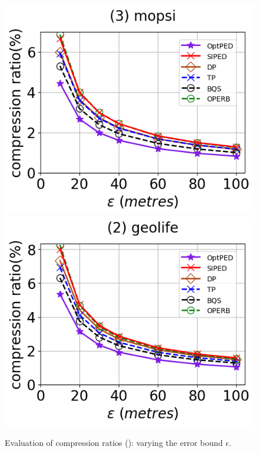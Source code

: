 \begin{figure}[tb!]
	\includegraphics[scale=0.315]{Figures/Exp-PED-CR-epsilon-mopsi.png}		\hspace{1ex}
	\includegraphics[scale=0.315]{Figures/Exp-PED-CR-epsilon-geolife.png}
	\vspace{-2.5ex}
	\caption{\small Evaluation of compression ratios (\ped): varying the error bound $\epsilon$.}
	\label{fig:cr-ped}
	\vspace{-2ex}
\end{figure}

